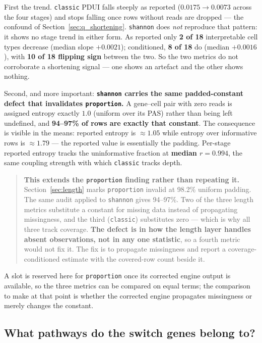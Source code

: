 \documentclass[11pt,a4paper]{article}
\begin{document}
First the trend. \texttt{classic} PDUI falls steeply as reported
($0.0175 \rightarrow 0.0073$ across the four stages) and stops falling once
rows without reads are dropped --- the confound of
Section~\ref{sec:q_shortening}. \texttt{shannon} does \emph{not} reproduce that
pattern: it shows no stage trend in either form. As reported only
\textbf{2 of 18} interpretable cell types decrease (median slope
$+0.0021$); conditioned, \textbf{8 of 18} do (median $+0.0016$), with
\textbf{10 of 18 flipping sign} between the two. So the two metrics do not
corroborate a shortening signal --- one shows an artefact and the other shows
nothing.

Second, and more important: \textbf{\texttt{shannon} carries the same
padded-constant defect that invalidates \texttt{proportion}.} A gene--cell pair
with zero reads is assigned entropy exactly $1.0$ (uniform over its PAS) rather
than being left undefined, and \textbf{94--97\% of rows are exactly that
constant}. The consequence is visible in the means: reported entropy is
$\approx 1.05$ while entropy over informative rows is $\approx 1.79$ --- the
reported value is essentially the padding. Per-stage reported entropy tracks the
uninformative fraction at \textbf{median $r = 0.994$}, the same coupling
strength with which \texttt{classic} tracks depth.

\begin{quote}
\textbf{This extends the \texttt{proportion} finding rather than repeating it.}
Section~\ref{sec:length} marks \texttt{proportion} invalid at 98.2\% uniform
padding. The same audit applied to \texttt{shannon} gives 94--97\%. Two of the
three length metrics substitute a constant for missing data instead of
propagating missingness, and the third (\texttt{classic}) substitutes zero ---
which is why all three track coverage. \textbf{The defect is in how the length
layer handles absent observations, not in any one statistic}, so a fourth metric
would not fix it. The fix is to propagate missingness and report a
coverage-conditioned estimate with the covered-row count beside it.
\end{quote}

A slot is reserved here for \texttt{proportion} once its corrected engine output
is available, so the three metrics can be compared on equal terms; the
comparison to make at that point is whether the corrected engine propagates
missingness or merely changes the constant.

\subsection{What pathways do the switch genes belong to?}
\label{sec:atlas_enrichment}
\end{document}
